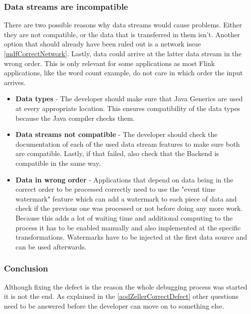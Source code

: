 \subsubsection{Data streams are incompatible}
\label{mdfCorrectDataStreams}
There are two possible reasons why data streams would cause problems. Either they are not compatible, or the data that is transferred in them isn't. Another option that should already have been ruled out is a network issue \ref{mdfCorrectNetwork}. Lastly, data could arrive at the latter data stream in the wrong order. This is only relevant for some applications as most Flink applications, like the word count example, do not care in which order the input arrives.
\begin{itemize}
  \item \textbf{Data types} - The developer should make sure that Java Generics are used at every appropriate location. This ensures compatibility of the data types because the Java compiler checks them.
  \item \textbf{Data streams not compatible} - The developer should check the documentation of each of the used data stream features to make sure both are compatible. Lastly, if that failed, also check that the Backend is compatible in the same way.
  \item \textbf{Data in wrong order} - Applications that depend on data being in the correct order to be processed correctly need to use the "event time watermark" feature which can add a watermark to each piece of data and check if the previous one was processed or not before doing any more work. Because this adds a lot of waiting time and additional computing to the process it has to be enabled manually and also implemented at the specific transformations. Watermarks have to be injected at the first data source and can be used afterwards.
\end{itemize}

\subsubsection{Conclusion}
Although fixing the defect is the reason the whole debugging process was started it is not the end. As explained in the \ref{aodZellerCorrectDefect} other questions need to be answered before the developer can move on to something else.

